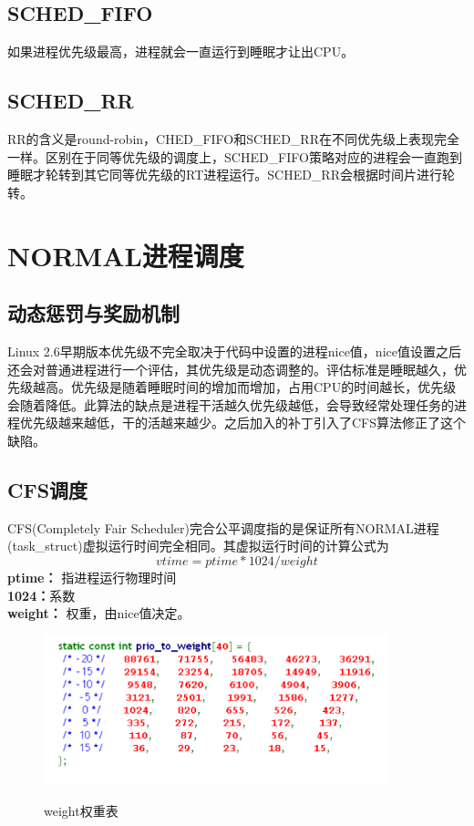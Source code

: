 \subsection{SCHED\_FIFO}
如果进程优先级最高，进程就会一直运行到睡眠才让出CPU。
\subsection{SCHED\_RR}
RR的含义是round-robin，CHED\_FIFO和SCHED\_RR在不同优先级上表现完全一样。区别在于同等优先级的调度上，SCHED\_FIFO策略对应的进程会一直跑到睡眠才轮转到其它同等优先级的RT进程运行。SCHED\_RR会根据时间片进行轮转。


\section{NORMAL进程调度}
\subsection{动态惩罚与奖励机制}
Linux 2.6早期版本优先级不完全取决于代码中设置的进程nice值，nice值设置之后还会对普通进程进行一个评估，其优先级是动态调整的。评估标准是睡眠越久，优先级越高。优先级是随着睡眠时间的增加而增加，占用CPU的时间越长，优先级会随着降低。此算法的缺点是进程干活越久优先级越低，会导致经常处理任务的进程优先级越来越低，干的活越来越少。之后加入的补丁引入了CFS算法修正了这个缺陷。
\subsection{CFS调度}
CFS(Completely Fair Scheduler)完合公平调度指的是保证所有NORMAL进程(task\_struct)虚拟运行时间完全相同。其虚拟运行时间的计算公式为
$$vtime = ptime * 1024 /weight $$
\noindent\textbf{ptime：} 指进程运行物理时间\\
\textbf{1024：}系数\\
\textbf{weight：} 权重，由nice值决定。\\

\begin{figure}[H]
 \wdfigbox
  {\caption{weight权重表}\label{cfs_weight}}
  {
  \includegraphics[width=10cm]{./figure/cfs_weight.png}
  }
\end{figure}

